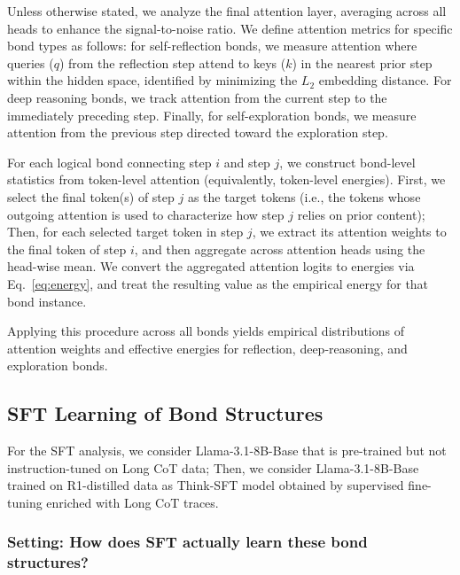 Unless otherwise stated, we analyze the final attention layer, averaging across all heads to enhance the signal-to-noise ratio. We define attention metrics for specific bond types as follows: for self-reflection bonds, we measure attention where queries ($q$) from the reflection step attend to keys ($k$) in the nearest prior step within the hidden space, identified by minimizing the $L_2$ embedding distance. For deep reasoning bonds, we track attention from the current step to the immediately preceding step. Finally, for self-exploration bonds, we measure attention from the previous step directed toward the exploration step.\vspace{-5pt}


For each logical bond connecting step \(i\) and step \(j\), we construct bond-level statistics from token-level attention (equivalently, token-level energies). First, we select the final token(s) of step \(j\) as the target tokens (i.e., the tokens whose outgoing attention is used to characterize how step \(j\) relies on prior content);
Then, for each selected target token in step \(j\), we extract its attention weights to the final token of step \(i\), and then aggregate across attention heads using the head-wise mean.
We convert the aggregated attention logits to energies via Eq.~\ref{eq:energy}, and treat the resulting value as the empirical energy for that bond instance.

Applying this procedure across all bonds yields empirical distributions of attention weights and effective energies for reflection, deep-reasoning, and exploration bonds.


\subsection{SFT Learning of Bond Structures}
\label{append:sft-learning}
For the SFT analysis, we consider Llama-3.1-8B-Base that is pre-trained but not instruction-tuned on Long CoT data;
Then, we consider Llama-3.1-8B-Base trained on R1-distilled data as Think-SFT model obtained by supervised fine-tuning enriched with Long CoT traces.\vspace{-5pt}



\subsubsection{Setting: How does SFT actually learn these bond structures?}
